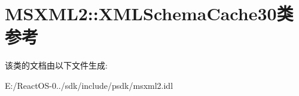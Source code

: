 \hypertarget{class_m_s_x_m_l2_1_1_x_m_l_schema_cache30}{}\section{M\+S\+X\+M\+L2\+:\+:X\+M\+L\+Schema\+Cache30类 参考}
\label{class_m_s_x_m_l2_1_1_x_m_l_schema_cache30}


该类的文档由以下文件生成\+:\begin{DoxyCompactItemize}
\item 
E\+:/\+React\+O\+S-\/0../sdk/include/psdk/msxml2.\+idl\end{DoxyCompactItemize}
